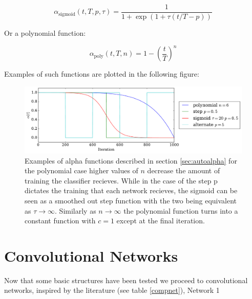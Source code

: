     \begin{equation}
      \alpha_{\text{sigmoid}}(t,T,p,\tau) = \frac{1}{1 + \exp(1 + \tau (t/T - p))}
    \end{equation}

    Or a polynomial function:

    \begin{equation}
      \alpha_{\text{poly}}(t,T,n) = 1 - \left ( \frac{t}{T} \right )^n
    \end{equation}

    Examples of such functions are plotted in the following figure:

    \begin{figure}[!h]
    \centering
    \includegraphics[width =\hsize]{figures/alpha.pdf}
    \caption{Examples of alpha functions described in section \ref{sec:autoalpha}
    for the polynomial case higher values of $n$ decrease the amount of training
    the classifier recieves. While in the case of the step p dictates the training
    that each network recieves, the sigmoid can be seen as a smoothed out step function
    with the two being equivalent as $ \tau \rightarrow \infty$. Similarly as $n \rightarrow \infty$
    the polynomial function turns into a constant function with $c=1$ except at the final
    iteration.}
    \label{fig:alpha_functions}
    \end{figure}


  \section{Convolutional Networks}

    Now that some basic structures have been tested we proceed to convolutional networks,
    inspired by the literature (see table \ref{compnet}), Network 1

